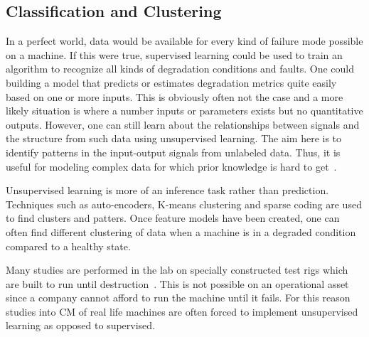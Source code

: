 \documentclass[]{article}
\begin{document}
\subsection{Classification and Clustering}
In a perfect world, data would be available for every kind of failure mode possible on a machine. If this were true, supervised learning could be used to train an algorithm to recognize all kinds of degradation conditions and faults. One could building a model that predicts or estimates degradation metrics quite easily based on one or more inputs. This is obviously often not the case and a more likely situation is where a number inputs or parameters exists but no quantitative outputs. However, one can still learn about the relationships between signals and the structure from such data using unsupervised learning. The aim here is to identify patterns in the input-output signals from unlabeled data. Thus, it is useful for modeling complex data for which prior knowledge is hard to get~\cite{martin2017unsupervised}.

Unsupervised learning is more of an inference task rather than prediction. Techniques such as auto-encoders, K-means clustering and sparse coding are used to find clusters and patters. Once feature models have been created, one can often find different clustering of data when a machine is in a degraded condition compared to a healthy state.

Many studies are performed in the lab on specially constructed test rigs which are built to run until destruction~\cite{soualhi2021novel, wang2016multiple, d2019physical, malhi2004pca}. This is not possible on an operational asset since a company cannot afford to run the machine until it fails. For this reason studies into \gls{CM} of real life machines are often forced to implement unsupervised learning as opposed to supervised.
\end{document}
